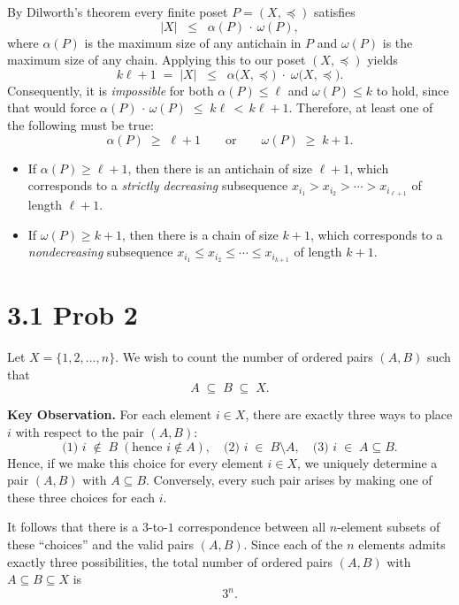\documentclass{report}
\begin{document}
\begin{proofWithHibiscus}
  By Dilworth's theorem every finite poset $P=(X,\preceq)$ satisfies
  \[
    |X|\;\;\le\;\;\alpha(P)\,\cdot\,\omega(P),
  \]
  where $\alpha(P)$ is the maximum size of any antichain in $P$ and $\omega(P)$ is the maximum size of any chain. 
  Applying this to our poset $(X,\preceq)$ yields
  \[
    k\ell + 1 
    \;=\;
    |X|
    \;\;\le\;\;
    \alpha\bigl(X,\preceq\bigr)\;\cdot\;\omega\bigl(X,\preceq\bigr).
  \]
  Consequently, it is \emph{impossible} for both $\alpha(P) \le \ell$ and $\omega(P) \le k$ to hold, 
  since that would force 
  \(
    \alpha(P)\,\cdot\,\omega(P) \;\le\; k\ell \,<\, k\ell+1.
  \)
  Therefore, at least one of the following must be true:
  \[
    \alpha(P) \;\ge\; \ell + 1
    \qquad\text{or}\qquad
    \omega(P) \;\ge\; k + 1.
  \]
  \begin{itemize}
    \item If $\alpha(P) \ge \ell + 1$, then there is an antichain of size $\ell + 1$,
      which corresponds to a \emph{strictly decreasing} subsequence 
      $x_{i_1} > x_{i_2} > \cdots > x_{i_{\ell+1}}$ of length $\ell + 1$.

    \item If $\omega(P) \ge k + 1$, then there is a chain of size $k + 1$, 
      which corresponds to a \emph{nondecreasing} subsequence 
      $x_{i_1} \le x_{i_2} \le \cdots \le x_{i_{k+1}}$ of length $k + 1$.
  \end{itemize}
\end{proofWithHibiscus}


\section*{3.1 Prob 2}


\begin{proofWithHibiscus}
  Let $X = \{1,2,\ldots,n\}$. We wish to count the number of ordered pairs $(A,B)$ such that
  \[
    A \;\subseteq\; B \;\subseteq\; X.
  \]
  \smallskip

  \noindent
  \textbf{Key Observation.} 
  For each element $i \in X$, there are exactly three ways to place $i$ with respect to the pair $(A,B)$:
  \[
    \text{(1) } i \;\notin\; B\;(\text{hence } i \notin A), 
    \quad 
    \text{(2) } i \;\in\; B \setminus A,
    \quad
    \text{(3) } i \;\in\; A \subseteq B.
  \]
  Hence, if we make this choice for every element $i \in X$, we uniquely determine a pair $(A,B)$ with $A \subseteq B$. Conversely, every such pair arises by making one of these three choices for each $i$.

  \medskip

  It follows that there is a $3$-to-$1$ correspondence between all $n$-element subsets of these “choices” and the valid pairs $(A,B)$. Since each of the $n$ elements admits exactly three possibilities, the total number of ordered pairs $(A,B)$ with $A \subseteq B \subseteq X$ is
  \[
    3^n.
  \]
\end{proofWithHibiscus}
\end{document}
